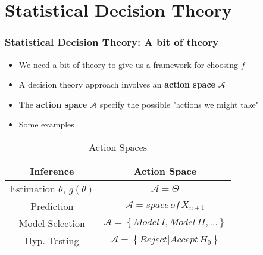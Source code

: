 \documentclass[
  shownotes,
  xcolor={svgnames},
  hyperref={colorlinks,citecolor=DarkBlue,linkcolor=DarkRed,urlcolor=DarkBlue}
  ]{beamer}
\begin{document}
\section{Statistical Decision Theory}
\begin{frame}
\frametitle{Statistical Decision Theory: A bit of theory}

\begin{itemize}
  \item We need a bit of theory to give us a framework for choosing $f$
  \item A decision theory approach involves an {\bf action space} $\mathcal{A}$
  \item The {\bf action space} $\mathcal{A}$ specify the possible "actions we might take"
  \item Some examples
\end{itemize}

\footnotesize

\begin{table}[H]
\caption{Action Spaces}

\begin{centering}
\begin{tabular}{cc}
\hline 
Inference & Action Space\\
\hline 
\hline 
Estimation $\theta$, $g\left(\theta\right)$  & $\mathcal{A}=\Theta$\\
Prediction & $\mathcal{A}=space\,of\,X_{n+1}$\\
Model Selection & $\mathcal{A}=\left\{ Model\,I,Model\,II,...\right\} $\\
Hyp. Testing & $\mathcal{A}=\left\{ Reject|Accept\,H_{0}\right\} $\\

\hline 
\end{tabular}
\par\end{centering}
\end{table}


\end{frame}

\end{document}

